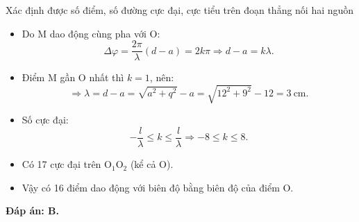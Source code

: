 \begin{dang}{Xác định được số điểm, số đường cực đại, cực tiểu trên đoạn thẳng nối hai nguồn}
{\begin{itemize}
			\item Do M dao động cùng pha với O:
			\begin{equation*}
				\Delta \varphi = \dfrac{2\pi}{\lambda} (d-a)=2k\pi \Rightarrow d-a=k\lambda.
			\end{equation*}
			\item Điểm M gần O nhất thì $k=1$, nên:
			\begin{equation*}
				\Rightarrow \lambda = d-a =\sqrt {a^2+q^2} - a =\sqrt {12^2+9^2} -12 =3\ \text{cm}.
			\end{equation*}
			\item Số cực đại:
			\begin{equation*}
				-\dfrac{l}{\lambda} \leq k \leq \dfrac{l}{\lambda} \Rightarrow -8 \leq k \leq 8.
			\end{equation*}
			\item Có 17 cực đại trên $\text{O}_1\text{O}_2$ (kể cả O).
			\item Vậy có 16 điểm dao động với biên độ bằng biên độ của điểm O.
		\end{itemize}
		
		\textbf{Đáp án: B.}
	}
	
\end{dang}
